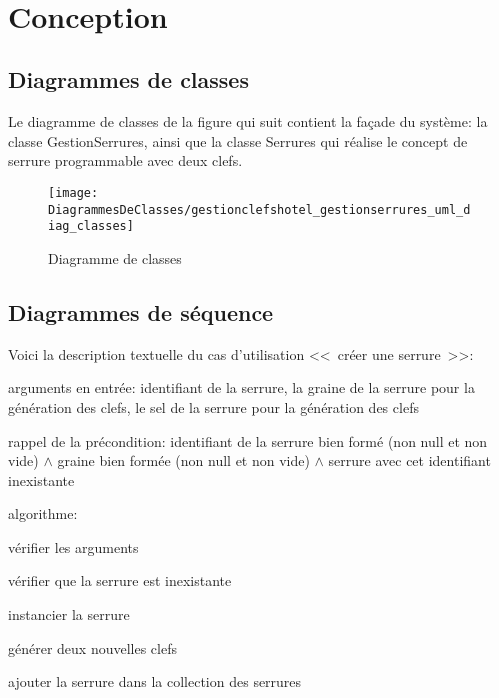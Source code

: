 \documentclass[11pt,article]{article}
\newcommand{\nullvalue}{\textsf{null}\xspace}
\begin{document}
\newpage~\newpage

\section{Conception}
\label{SS_simserrures_conception}

\subsection{Diagrammes de classes}

Le diagramme de classes de la figure qui suit contient la façade du
système: la classe \textsf{GestionSerrures}, ainsi que la classe
\textsf{Serrures} qui réalise le concept de serrure programmable avec
deux clefs.

\begin{figure}[!ht]
\begin{center}
\texttt{[image: DiagrammesDeClasses/gestionclefshotel\_gestionserrures\_uml\_diag\_classes]}
\caption{Diagramme de classes}
\end{center}
\label{umlet_simserrures_diag_classes}
\end{figure}

\newpage

\subsection{Diagrammes de séquence}

Voici la description textuelle du cas d'utilisation <<~créer une serrure~>>:
\begin{compactitem}
\item arguments en entrée: identifiant de la serrure, la graine de la
  serrure pour la génération des clefs, le sel de la serrure pour la
  génération des clefs
\item rappel de la précondition: identifiant de la serrure bien
  formé (non \nullvalue et non vide) $\land$ graine bien formée (non
  \nullvalue et non vide) $\land$ serrure avec cet identifiant
  inexistante
\item algorithme:
\begin{compactenum}
\item vérifier les arguments
\item vérifier que la serrure est inexistante
\item instancier la serrure
  \begin{compactitem}
  \item générer deux nouvelles clefs
  \end{compactitem}
\item ajouter la serrure dans la collection des serrures
\end{compactenum}
\end{compactitem}
\end{document}
